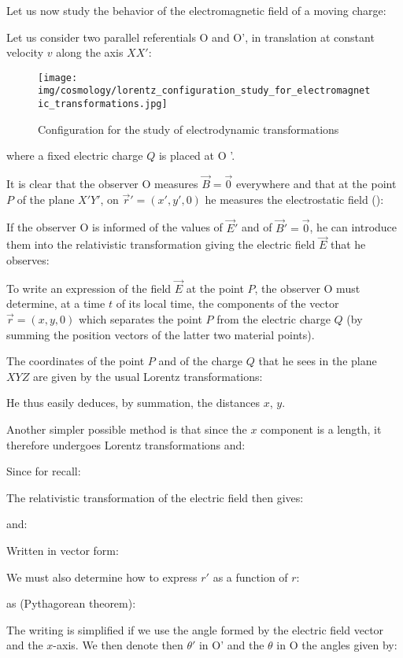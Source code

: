	Let us now study the behavior of the electromagnetic field of a moving charge:

	Let us consider two parallel referentials O and O', in translation at constant velocity $v$ along the axis $XX'$:
	\begin{figure}[H]
		\centering
		\texttt{[image: img/cosmology/lorentz\_configuration\_study\_for\_electromagnetic\_transformations.jpg]}
		\caption{Configuration for the study of electrodynamic transformations}
	\end{figure}
	where a fixed electric charge $Q$ is placed at O '.

	It is clear that the observer O measures $\vec{B}=\vec{0}$ everywhere and that at the point $P$ of the plane $X 'Y'$, on $\vec{r}'=(x',y',0)$ he measures the electrostatic field ():
	
	If the observer O is informed of the values of $\vec{E}'$ and of $\vec{B}'=\vec{0}$, he can introduce them into the relativistic transformation giving the electric field $\vec{E}$ that he observes:
	
	To write an expression of the field $\vec{E}$ at the point $P$, the observer O must determine, at a time $t$ of its local time, the components of the vector $\vec{r}=(x,y,0)$ which separates the point $P$ from the electric charge $Q$ (by summing the position vectors of the latter two material points).

	The coordinates of the point $P$ and of the charge $Q$ that he sees in the plane $XYZ$ are given by the usual Lorentz transformations:
	
	He thus easily deduces, by summation, the distances $x$, $y$.

	Another simpler possible method is that since the $x$ component is a length, it therefore undergoes Lorentz transformations and:
	
	Since for recall:
	
	The relativistic transformation of the electric field then gives:
	
	and:
	
	Written in vector form:
	
	We must also determine how to express $r'$ as a function of $r$:
	
	as (Pythagorean theorem):
	
	The writing is simplified if we use the angle formed by the electric field vector and the $x$-axis. We then denote then $\theta'$ in O' and the $\theta$ in O the angles given by:
	

